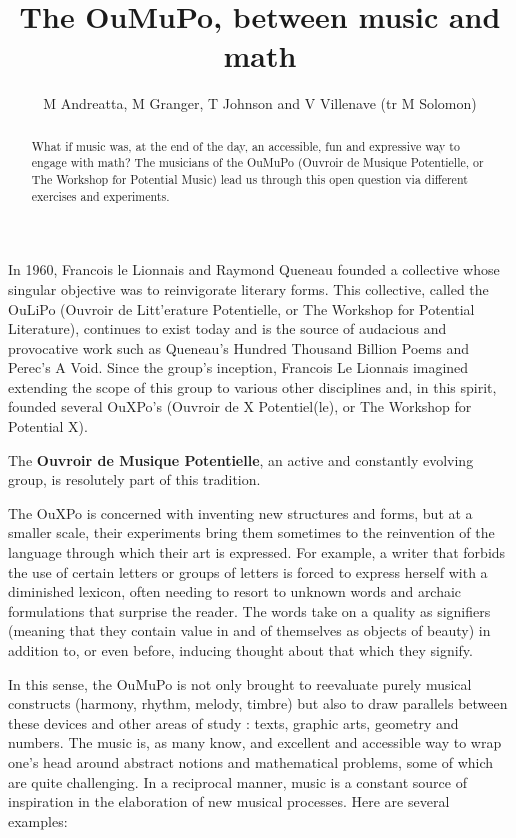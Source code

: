 \documentclass{article}
\title{The OuMuPo, between music and math}
\author{M Andreatta, M Granger, T Johnson and V Villenave
(tr M Solomon)}
\begin{document}
\maketitle
\begin{abstract}
What if music was, at the end of the day, an accessible, fun and expressive way to engage with math? The musicians of the OuMuPo (Ouvroir de Musique Potentielle, or The Workshop for Potential Music) lead us through this open question via different exercises and experiments.
\end{abstract}

In 1960, Fran{c}ois le Lionnais and Raymond Queneau founded a collective whose singular objective was to reinvigorate literary forms. This collective, called the OuLiPo (Ouvroir de Litt'{e}rature Potentielle, or The Workshop for Potential Literature), continues to exist today and is the source of audacious and provocative work such as Queneau’s Hundred Thousand Billion Poems and Perec’s A Void. Since the group’s inception, Fran{c}ois Le Lionnais imagined extending the scope of this group to various other disciplines and, in this spirit, founded several OuXPo’s (Ouvroir de X Potentiel(le), or The Workshop for Potential
X).


The \textbf{Ouvroir de Musique Potentielle}, an active and constantly evolving group, is resolutely part of this tradition.

The OuXPo is concerned with inventing new structures and forms, but at a smaller scale, their experiments bring them sometimes to the reinvention of the language through which their art is expressed.  For example, a writer that forbids the use of certain letters or groups of letters is forced to express herself with a diminished lexicon, often needing to resort to unknown words and archaic formulations that surprise the reader.  The words take on a quality as signifiers (meaning that they contain value in and of themselves as objects of beauty) in addition to, or even before, inducing thought about that which they signify.

In this sense, the OuMuPo is not only brought to reevaluate purely musical constructs (harmony, rhythm, melody, timbre) but also to draw parallels between these devices and other areas of study : texts, graphic arts, geometry and numbers.  The music is, as many know, and excellent and accessible way to wrap one’s head around abstract notions and mathematical problems, some of which are quite challenging.  In a reciprocal manner, music is a constant source of inspiration in the elaboration of new musical processes.  Here are several examples:
\end{document}
